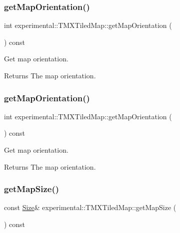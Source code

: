 \subsubsection{\texorpdfstring{get\+Map\+Orientation()}{getMapOrientation()}\hspace{0.1cm}{\footnotesize\ttfamily [1/2]}}
{\footnotesize\ttfamily int experimental\+::\+T\+M\+X\+Tiled\+Map\+::get\+Map\+Orientation (\begin{DoxyParamCaption}{ }\end{DoxyParamCaption}) const\hspace{0.3cm}{\ttfamily [inline]}}

Get map orientation.

\begin{DoxyReturn}{Returns}
The map orientation. 
\end{DoxyReturn}
\mbox{\label{classexperimental_1_1TMXTiledMap_a2ef62c3afec1af3e4368c9123b28e53b}} 
\subsubsection{\texorpdfstring{get\+Map\+Orientation()}{getMapOrientation()}\hspace{0.1cm}{\footnotesize\ttfamily [2/2]}}
{\footnotesize\ttfamily int experimental\+::\+T\+M\+X\+Tiled\+Map\+::get\+Map\+Orientation (\begin{DoxyParamCaption}{ }\end{DoxyParamCaption}) const\hspace{0.3cm}{\ttfamily [inline]}}

Get map orientation.

\begin{DoxyReturn}{Returns}
The map orientation. 
\end{DoxyReturn}
\mbox{\label{classexperimental_1_1TMXTiledMap_a4c7f3f5487c6c8e8e597dfbba31e7659}} 
\subsubsection{\texorpdfstring{get\+Map\+Size()}{getMapSize()}\hspace{0.1cm}{\footnotesize\ttfamily [1/2]}}
{\footnotesize\ttfamily const \hyperlink{classSize}{Size}\& experimental\+::\+T\+M\+X\+Tiled\+Map\+::get\+Map\+Size (\begin{DoxyParamCaption}{ }\end{DoxyParamCaption}) const\hspace{0.3cm}{\ttfamily [inline]}}


